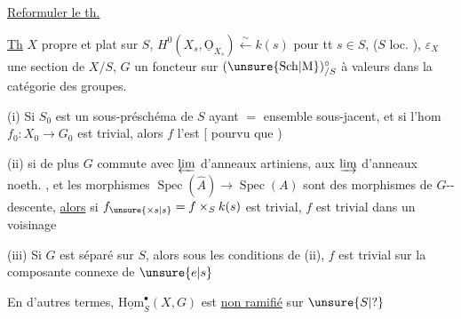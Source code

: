 \uline{Reformuler le th.}

\uline{Th} $X$ propre et plat sur $S$, $H^0(X_s,\underline{\mathrm O}_{X_s})\xleftarrow{\sim}k(s)$ pour tt $s\in S$, ($S$ loc. ), $\varepsilon_X$ une section de $X/S$,  $G$ un foncteur sur $(\unsure{\mathrm{Sch}|\mathrm M})_{/S}^{\circ}$ à valeurs dans la catégorie des groupes.   

(i) Si $S_0$ est un sous-préschéma  de $S$ ayant $=$ ensemble sous-jacent, et si  l'hom $f_0:X_0\longrightarrow G_0$ est trivial, alors $f$ l'est [ pourvu que  )

(ii) si de plus $G$ commute avec $\varprojlim$ d'anneaux artiniens, aux $\varinjlim$ d'anneaux noeth. , et  les morphismes $\operatorname{Spec}(\widehat A)\longrightarrow\operatorname{Spec}(A)$ sont des morphismes de $G$--descente, \uline{alors} si $f_{\unsure{\times s|s}}=f\times_S k(s)$ est trivial, $f$ est trivial dans un voisinage

(iii) Si $G$ est séparé sur $S$, alors sous les conditions de (ii),  $f$ est trivial sur la composante connexe de $\unsure{e|s}$

En d'autres termes, $\underline{\mathrm{Hom}}_S^{\bullet}(X,G)$ est \uline{non ramifié} sur $\unsure{S|?}$
